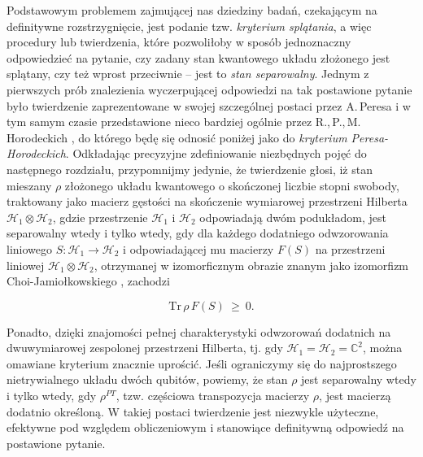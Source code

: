 Podstawowym problemem zajmującej nas dziedziny badań,
czekającym na definitywne rozstrzygnięcie,
jest podanie tzw. \emph{kryterium splątania},
a więc procedury lub twierdzenia,
które pozwoliłoby w sposób jednoznaczny odpowiedzieć na pytanie,
czy zadany stan kwantowego układu złożonego jest splątany,
czy też wprost przeciwnie -- jest to
 \emph{stan separowalny}.
Jednym z pierwszych prób znalezienia wyczerpującej odpowiedzi na tak postawione
pytanie było twierdzenie zaprezentowane w swojej szczególnej postaci
przez A.\,Peresa
\cite{peres1996separability}
i w tym samym czasie przedstawione nieco bardziej ogólnie przez
R.,\,P.,\,M.\,Horodeckich
\cite{horodecki1996separability},
do którego będę się odnosić poniżej jako do
 \emph{kryterium Peresa-Horodeckich}.
Odkładając precyzyjne zdefiniowanie niezbędnych pojęć do następnego rozdziału,
przypomnijmy jedynie, że twierdzenie głosi,
iż stan mieszany $\rho$ złożonego układu kwantowego o skończonej liczbie
stopni swobody,
traktowany jako macierz gęstości na skończenie wymiarowej przestrzeni
Hilberta $\mathcal{H}_{1} \! \otimes \! \mathcal{H}_{2}$,
gdzie przestrzenie $\mathcal{H}_{1}$ i $\mathcal{H}_{2}$ odpowiadają dwóm podukładom,
jest separowalny wtedy i tylko wtedy,
gdy dla każdego dodatniego odwzorowania liniowego
$S \!: \mathcal{H}_{1} \rightarrow \mathcal{H}_{2}$
i odpowiadającej mu macierzy $F(S)$ na przestrzeni liniowej
$\mathcal{H}_{1} \! \otimes \! \mathcal{H}_{2}$,
otrzymanej w izomorficznym obrazie znanym jako izomorfizm Choi-Jamiołkowskiego
\cite{choi1975completely, jamiolkowski1972linear},
zachodzi
\begin{linenomath*}
 \begin{equation}
    \nonumber
    \label{eq:PHcriterionOrig}
    \text{Tr} \, \rho \, F(S) \: \geq \: 0.
 \end{equation}
\end{linenomath*}
Ponadto, dzięki znajomości pełnej charakterystyki odwzorowań dodatnich
na dwuwymiarowej zespolonej przestrzeni Hilberta,
tj. gdy $\mathcal{H}_{1} = \mathcal{H}_{2} = \mathbb{C}^{2}$,
można omawiane kryterium znacznie uprościć.
Jeśli ograniczymy się do najprostszego nietrywialnego układu dwóch qubitów,
powiemy,
że stan $\rho$ jest separowalny wtedy i tylko wtedy,
gdy $\rho^{PT}$, tzw. częściowa transpozycja macierzy $\rho$,
jest macierzą dodatnio określoną.
W takiej postaci twierdzenie jest niezwykle użyteczne, efektywne pod względem
obliczeniowym i stanowiące definitywną odpowiedź na postawione pytanie.
